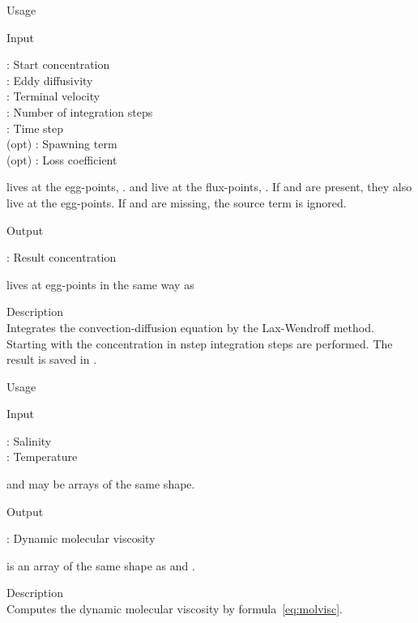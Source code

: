 {\begin{tdesc}
\item[Usage] 
\item[Input]
  \begin{vartab}
    \> : \> Start concentration \>  [eggs/m$^3$] \\
     \> : \> Eddy diffusivity    \>  [\sqmps]  \\
     \> : \> Terminal velocity   \>  [\mps]  \\
    \> : \> Number of integration steps \\
       \> : \> Time step           \>  [s] \\
       (opt) \> : \> Spawning term       \>  [eggs/m$^3$/s] \\
   (opt) \> : \> Loss coefficient \> [1/s] 
  \end{vartab}
   lives at the egg-points, .
   and  live at the flux-points, .
  If  and  are present, they also live at the egg-points.
  If  and  are missing, the source term is ignored. 
\item[Output]
  \begin{vartab}
   \>  : \> Result concentration \> [eggs/m$^3$]
  \end{vartab}
   lives at egg-points in the same way as 
\item[Description]\mbox{}\\
  Integrates the convection-diffusion equation by the 
  Lax-Wendroff method. Starting with the concentration
  in  nstep integration steps are performed. The 
  result is saved in .
\end{tdesc}


\begin{tdesc}
\item[Usage] 
\item[Input]
  \begin{vartab}
         \> : \> Salinity     \>   [psu]   \\
         \> : \> Temperature  \>   [\degC] 
  \end{vartab}
   and  may be arrays of the same shape.
\item[Output]
  \begin{vartab}
     \> : \> Dynamic molecular viscosity \>  [kgm$^{-1}$s$^{-1}$] 
  \end{vartab}
   is an array of the same shape as  and .
\item[Description] \mbox{}\\
  Computes the dynamic molecular viscosity by formula~\eqref{eq:molvisc}.
\end{tdesc}


}
